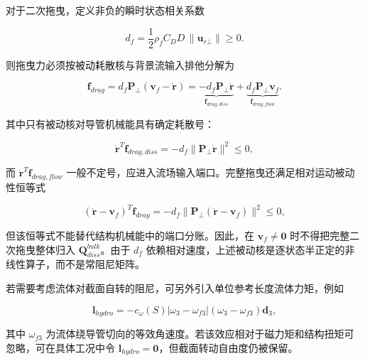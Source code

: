 对于二次拖曳，定义非负的瞬时状态相关系数

\begin{equation}
\label{eq:rod-1-62}
d_{f} = \frac{1}{2}\rho_{f}C_{D}D\, \parallel \mathbf{u}_{r\bot} \parallel \geq 0.
\end{equation}

则拖曳力必须按被动耗散核与背景流输入排他分解为

\begin{equation}
\label{eq:rod-1-63}
\boxed{\mathbf{f}_{drag} = d_{f}\mathbf{P}_{\bot}\left( \mathbf{v}_{f} - \dot{\mathbf{r}} \right) = \underset{\mathbf{f}_{drag,diss}}{\underbrace{- d_{f}\mathbf{P}_{\bot}\dot{\mathbf{r}}}} + \underset{\mathbf{f}_{drag,flow}}{\underbrace{d_{f}\mathbf{P}_{\bot}\mathbf{v}_{f}}}.}
\end{equation}

其中只有被动核对导管机械能具有确定耗散号：

\begin{equation}
\label{eq:rod-1-64}
{\dot{\mathbf{r}}}^{T}\mathbf{f}_{drag,diss} = - d_{f} \parallel \mathbf{P}_{\bot}\dot{\mathbf{r}} \parallel^{2} \leq 0,
\end{equation}

而 \({\dot{\mathbf{r}}}^{T}\mathbf{f}_{drag,flow}\) 一般不定号，应进入流场输入端口。完整拖曳还满足相对运动被动性恒等式

\begin{equation}
\label{eq:rod-1-65}
\left( \dot{\mathbf{r}} - \mathbf{v}_{f} \right)^{T}\mathbf{f}_{drag} = - d_{f} \parallel \mathbf{P}_{\bot}\left( \dot{\mathbf{r}} - \mathbf{v}_{f} \right) \parallel^{2} \leq 0,
\end{equation}

但该恒等式不能替代结构机械能中的端口分账。因此，在 \(\mathbf{v}_{f} \neq \mathbf{0}\) 时不得把完整二次拖曳整体归入 \(\mathbf{Q}_{diss}^{bulk}\)。由于 \(d_{f}\) 依赖相对速度，上述被动核是逐状态半正定的非线性算子，而不是常阻尼矩阵。

若需要考虑流体对截面自转的阻尼，可另外引入单位参考长度流体力矩，例如

\begin{equation}
\label{eq:rod-1-66}
\mathbf{l}_{hydro} = - c_{\omega}(S)\left| \omega_{3} - \omega_{f3} \right|\left( \omega_{3} - \omega_{f3} \right)\mathbf{d}_{3},
\end{equation}

其中 \(\omega_{f3}\) 为流体绕导管切向的等效角速度。若该效应相对于磁力矩和结构扭矩可忽略，可在具体工况中令 \(\mathbf{l}_{hydro} = \mathbf{0}\)，但截面转动自由度仍被保留。

